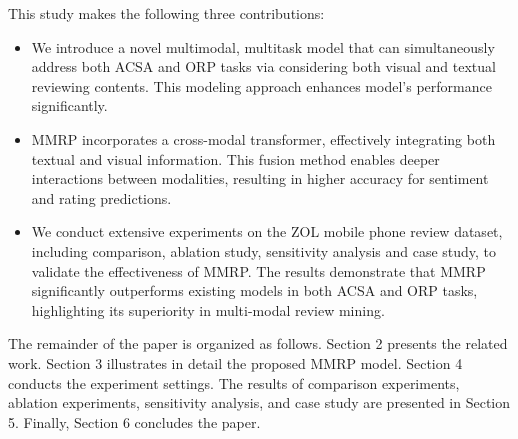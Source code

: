 \documentclass[preprint,12pt]{elsarticle}
\begin{document}
This study makes the following three contributions:
\begin{itemize}
    \item We introduce a novel multimodal, multitask model that can simultaneously address both ACSA and ORP tasks via considering both visual and textual reviewing contents. This modeling approach enhances model's performance significantly.

    \item MMRP incorporates a cross-modal transformer, effectively integrating both textual and visual information.  This fusion method enables deeper interactions between modalities, resulting in higher accuracy for sentiment and rating predictions.
    
    \item We conduct extensive experiments on the ZOL mobile phone review dataset, including comparison, ablation study, sensitivity analysis and case study, to validate the effectiveness of MMRP. The results demonstrate that MMRP significantly outperforms existing models in both ACSA and ORP tasks, highlighting its superiority in multi-modal review mining.
\end{itemize}



The remainder of the paper is organized as follows. Section 2 presents the related work. Section 3 illustrates in detail the proposed MMRP model. Section 4 conducts the experiment settings. The results of comparison experiments, ablation experiments, sensitivity analysis, and case study are presented in Section 5. Finally, Section 6 concludes the paper.
\end{document}
